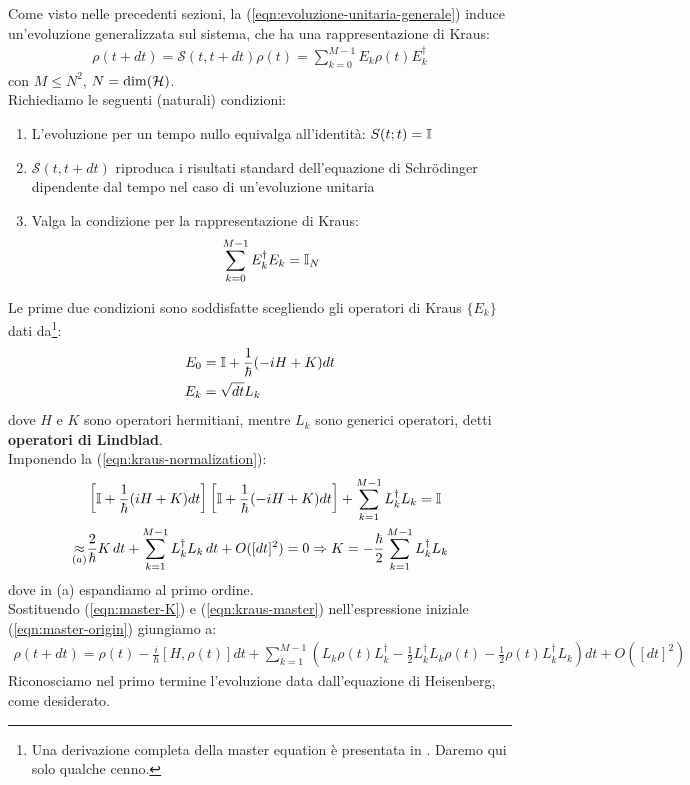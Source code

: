 \documentclass[../../InformazioneQuantistica.tex]{subfiles}
\begin{document}
Come visto nelle precedenti sezioni, la (\ref{eqn:evoluzione-unitaria-generale}) induce un'evoluzione generalizzata sul sistema, che ha una rappresentazione di Kraus:
\begin{align}\label{eqn:master-origin}
\rho(t+dt) = \mathcal{S}(t,t+dt) \rho(t) = \sum_{k=0}^{M-1} E_k \rho(t) E_k^\dag
\end{align}
con $M \leq N^2$, $N=\operatorname{dim}(\mathcal{H})$.\\

Richiediamo le seguenti (naturali) condizioni:
\begin{enumerate}
\item L'evoluzione per un tempo nullo equivalga all'identità: $S(t;t) = \mathbb{I}$
\item $\mathcal{S}(t,t+dt)$ riproduca i risultati standard dell'equazione di Schr\"odinger dipendente dal tempo nel caso di un'evoluzione unitaria
\item Valga la condizione per la rappresentazione di Kraus:
\begin{align} \label{eqn:kraus-normalization}
\sum_{k=0}^{M-1} E_k^\dag E_k = \mathbb{I}_N
\end{align}
\end{enumerate}

Le prime due condizioni sono soddisfatte scegliendo gli operatori di Kraus $\{E_k\}$ dati da\footnote{Una derivazione completa della master equation è presentata in \cite{master}. Daremo qui solo qualche cenno.}:
\begin{align}
E_0 &= \mathbb{I} + \frac{1}{\hbar}(-iH+K)dt\\
E_k &= \sqrt{dt} L_k
\label{eqn:kraus-master}
\end{align}
dove $H$ e $K$ sono operatori hermitiani, mentre $L_k$ sono generici operatori, detti \textbf{operatori di Lindblad}.\\

Imponendo la (\ref{eqn:kraus-normalization}):
\begin{align}\nonumber
&\left[\mathbb{I}+\frac{1}{\hbar}(iH+K)dt \right]\left[\mathbb{I}+\frac{1}{\hbar}(-iH+K)dt\right]+\sum_{k=1}^{M-1} L_k^\dag L_k = \mathbb{I}\\ \label{eqn:master-K}
\underset{(a)}{\approx} & \frac{2}{\hbar}K\,dt + \sum_{k=1}^{M-1} L_k^\dag L_k\,dt + O([dt]^2) = 0 \Rightarrow K = -\frac{\hbar}{2} \sum_{k=1}^{M-1}L_k^\dag L_k 
\end{align}
dove in (a) espandiamo al primo ordine.\\

Sostituendo (\ref{eqn:master-K}) e (\ref{eqn:kraus-master}) nell'espressione iniziale (\ref{eqn:master-origin}) giungiamo a:
\begin{align}
\rho(t+dt)=\rho(t) - \frac{i}{\hbar}[H,\rho(t)]dt + \sum_{k=1}^{M-1} \left( L_k \rho(t) L_k^\dag - \frac{1}{2}L_k^\dag L_k\rho(t) - \frac{1}{2}\rho(t) L_k^\dag L_k \right)dt + O([dt]^2)
\label{eqn:master-rhot}
\end{align}
Riconosciamo nel primo termine l'evoluzione data dall'equazione di Heisenberg, come desiderato.\\
\end{document}
